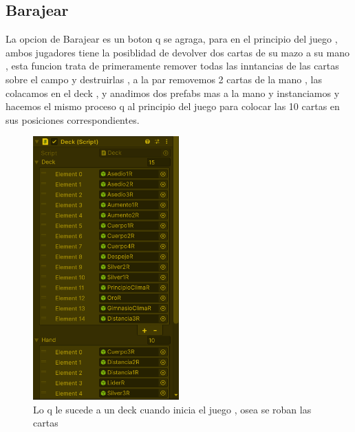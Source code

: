 \documentclass{article}
\begin{document}
\subsection{Barajear}
La opcion de Barajear es un boton q se agraga, para en el principio del juego , ambos jugadores tiene la posiblidad de devolver dos cartas de su mazo a su mano , esta funcion trata de primeramente remover todas las inntancias de las cartas sobre el campo y destruirlas , a la par removemos 2 cartas de la mano , las colacamos en el deck , y anadimos dos prefabs mas a la mano y instanciamos y hacemos el mismo proceso q al principio del juego para colocar las 10 cartas en sus posiciones correspondientes.
\begin{figure}
\centering
\includegraphics[width =0.5\textwidth]
{2}
\caption{Lo q le sucede a un deck cuando inicia el juego , osea se roban las cartas}
\label{fig : a}
\end{figure}
\newpage
\end{document}
